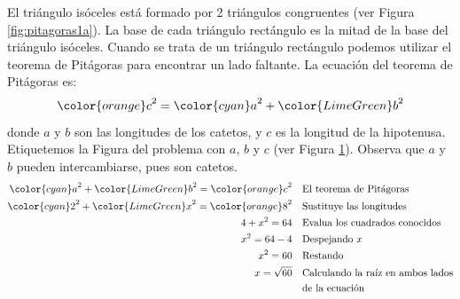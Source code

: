 \begin{solutionbox}{13cm}
\begin{minipage}{0.3\textwidth}
\begin{figure}[H]
            \caption{}
            \label{fig:pitagoras1b}
        \end{figure}
    \end{minipage}\hfill
    \begin{minipage}{0.65\textwidth}
        El triángulo isóceles está formado por 2 triángulos congruentes (ver Figura \ref{fig:pitagoras1a}).
        La base de cada triángulo rectángulo es la mitad de la base del triángulo isóceles.
        Cuando se trata de un triángulo rectángulo podemos utilizar el teorema de Pitágoras para encontrar un lado faltante.
        La ecuación del teorema de Pitágoras es:
        \[{\color{orange}c}^2={\color{cyan}a}^2+{\color{LimeGreen}b}^2\]
        donde $a$ y $b$ son las longitudes de los catetos, y $c$ es la longitud de la hipotenusa.
        Etiquetemos la Figura del problema con $a$, $b$ y $c$ (ver Figura \ref{fig:pitagoras1b}).
        Observa que $a$ y $b$ pueden intercambiarse, pues son catetos.
        \begin{align*}
            {\color{cyan}a}^2+{\color{LimeGreen}b}^2  ={\color{orange}c}^2 & \text{\quad El teorema de Pitágoras}           \\
            {\color{cyan}2}^2+{\color{LimeGreen}x}^2  ={\color{orange}8}^2 & \text{\quad Sustituye las longitudes}          \\
            4+x^2  =64                                                     & \text{\quad Evalua los cuadrados conocidos}    \\
            x^2=64-4                                                       & \text{\quad Despejando } x                     \\
            x^2=60                                                         & \text{\quad Restando}                          \\
            x=\sqrt{60}                                                    & \text{\quad Calculando la raíz en ambos lados} \\
                                                                           & \text{\quad de la ecuación}                    \\
        \end{align*}
    \end{minipage}
\end{solutionbox}
